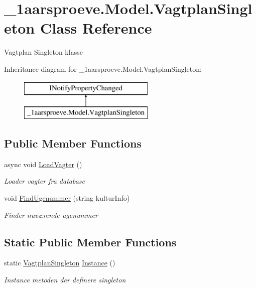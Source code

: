\hypertarget{class__1aarsproeve_1_1_model_1_1_vagtplan_singleton}{}\section{\+\_\+1aarsproeve.\+Model.\+Vagtplan\+Singleton Class Reference}
\label{class__1aarsproeve_1_1_model_1_1_vagtplan_singleton}


Vagtplan Singleton klasse  


Inheritance diagram for \+\_\+1aarsproeve.\+Model.\+Vagtplan\+Singleton\+:\begin{figure}[H]
\begin{center}
\leavevmode
\includegraphics[height=2.000000cm]{class__1aarsproeve_1_1_model_1_1_vagtplan_singleton}
\end{center}
\end{figure}
\subsection*{Public Member Functions}
\begin{DoxyCompactItemize}
\item 
async void \hyperlink{class__1aarsproeve_1_1_model_1_1_vagtplan_singleton_a7cf593f90e97b6bfc4cc4ef9ba63e40c}{Load\+Vagter} ()
\begin{DoxyCompactList}\small\item\em Loader vagter fra database \end{DoxyCompactList}\item 
void \hyperlink{class__1aarsproeve_1_1_model_1_1_vagtplan_singleton_a7d8478359fc4142a09a94d39a7e58c62}{Find\+Ugenummer} (string kultur\+Info)
\begin{DoxyCompactList}\small\item\em Finder nuværende ugenummer \end{DoxyCompactList}\end{DoxyCompactItemize}
\subsection*{Static Public Member Functions}
\begin{DoxyCompactItemize}
\item 
static \hyperlink{class__1aarsproeve_1_1_model_1_1_vagtplan_singleton}{Vagtplan\+Singleton} \hyperlink{class__1aarsproeve_1_1_model_1_1_vagtplan_singleton_ab386b430d57794877f7b6ff0ca8b4ce6}{Instance} ()
\begin{DoxyCompactList}\small\item\em Instance metoden der definere singleton \end{DoxyCompactList}\end{DoxyCompactItemize}
